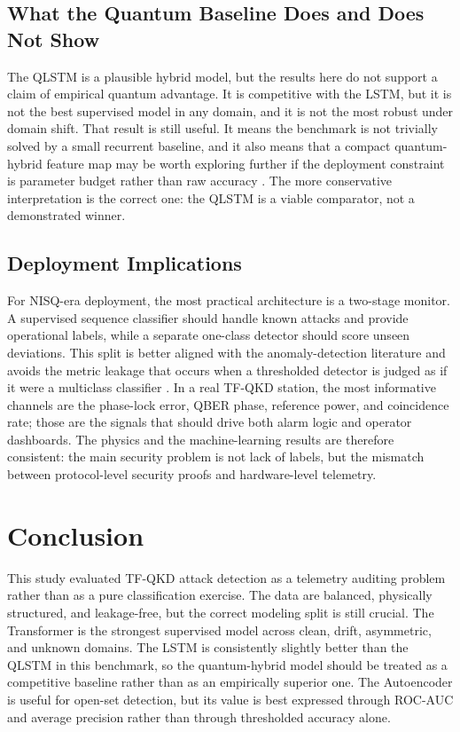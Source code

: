 \subsection{What the Quantum Baseline Does and Does Not Show}
The QLSTM is a plausible hybrid model, but the results here do not support a claim of empirical quantum advantage. It is competitive with the LSTM, but it is not the best supervised model in any domain, and it is not the most robust under domain shift. That result is still useful. It means the benchmark is not trivially solved by a small recurrent baseline, and it also means that a compact quantum-hybrid feature map may be worth exploring further if the deployment constraint is parameter budget rather than raw accuracy \cite{qlstm, chen, mcclean2018barren, cerezo2021variational, bergholm2018pennylane, larocca2024review, gilfuster2024generalization, haug2024qfim}. The more conservative interpretation is the correct one: the QLSTM is a viable comparator, not a demonstrated winner.
\subsection{Deployment Implications}
For NISQ-era deployment, the most practical architecture is a two-stage monitor. A supervised sequence classifier should handle known attacks and provide operational labels, while a separate one-class detector should score unseen deviations. This split is better aligned with the anomaly-detection literature and avoids the metric leakage that occurs when a thresholded detector is judged as if it were a multiclass classifier \cite{lu, corli2024review, lu2020quantum}. In a real TF-QKD station, the most informative channels are the phase-lock error, QBER phase, reference power, and coincidence rate; those are the signals that should drive both alarm logic and operator dashboards. The physics and the machine-learning results are therefore consistent: the main security problem is not lack of labels, but the mismatch between protocol-level security proofs and hardware-level telemetry.

\FloatBarrier

\section{Conclusion}
This study evaluated TF-QKD attack detection as a telemetry auditing problem rather than as a pure classification exercise. The data are balanced, physically structured, and leakage-free, but the correct modeling split is still crucial. The Transformer is the strongest supervised model across clean, drift, asymmetric, and unknown domains. The LSTM is consistently slightly better than the QLSTM in this benchmark, so the quantum-hybrid model should be treated as a competitive baseline rather than as an empirically superior one. The Autoencoder is useful for open-set detection, but its value is best expressed through ROC-AUC and average precision rather than through thresholded accuracy alone.

